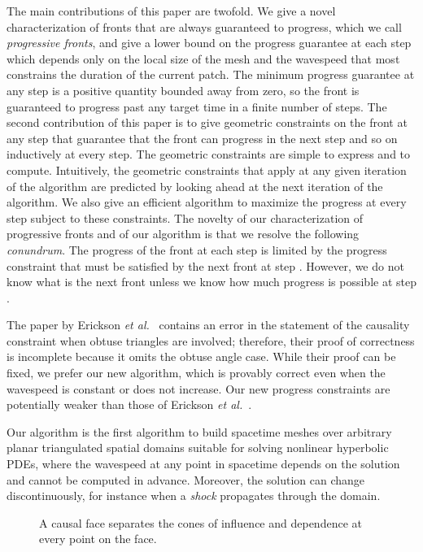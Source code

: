 \documentclass[twocolumn]{article}
\newif\iffig
\def\etal{\textsl{et al.}}
\begin{document}
The main contributions of this paper are twofold.  We give a novel
characterization of fronts that are always guaranteed to progress,
which we call \emph{progressive fronts}, and give a lower bound on the
progress guarantee at each step which depends only on the local size
of the mesh and the wavespeed that most constrains the duration of the
current patch.  The minimum progress guarantee at any step is a
positive quantity bounded away from zero, so the front is guaranteed
to progress past any target time in a finite number of steps.  The
second contribution of this paper is to give geometric constraints on
the front at any step that guarantee that the front can progress in
the next step and so on inductively at every step.  The geometric
constraints are simple to express and to compute.  Intuitively, the
geometric constraints that apply at any given iteration of the
algorithm are predicted by looking ahead at the next iteration of the
algorithm.  We also give an efficient algorithm to maximize the
progress at every step subject to these constraints.  The novelty of
our characterization of progressive fronts and of our algorithm is
that we resolve the following \emph{conundrum}.  The progress of the
front at each step  is limited by the progress constraint that must
be satisfied by the next front at step .  However, we do not know
what is the next front unless we know how much progress is possible at
step .

The paper by Erickson \etal{}~\cite{erickson02building} contains an
error in the statement of the causality constraint when obtuse
triangles are involved; therefore, their proof of correctness is
incomplete because it omits the obtuse angle case.  While their proof
can be fixed, we prefer our new algorithm, which is provably correct
even when the wavespeed is constant or does not increase.  Our new
progress constraints are potentially weaker than those of Erickson
\etal{}~\cite{erickson02building}.

Our algorithm is the first algorithm to build spacetime meshes over
arbitrary planar triangulated spatial domains suitable for solving
nonlinear hyperbolic PDEs, where the wavespeed at any point in
spacetime depends on the solution and cannot be computed in advance.
Moreover, the solution can change discontinuously, for instance when a
\emph{shock} propagates through the domain.

\begin{figure}\centering\sf
\iffig\texttt{[image: fig/doublecone]}\fi
\caption{A causal face separates the cones of influence and dependence
at every point on the face.}
\label{fig:causalface}
\end{figure}
\end{document}
